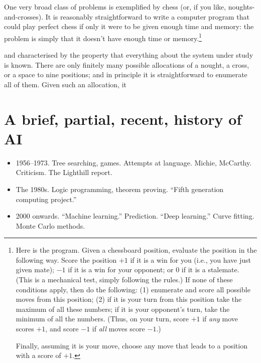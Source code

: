 \documentclass[10pt, a4paper, twocolumn]{article}
\begin{document}
One very broad class of problems is exemplified by chess (or, if you like,
noughts-and-crosses). It is reasonably straightforward to write a computer
program that could play perfect chess if only it were to be given enough time
and memory: the problem is simply that it doesn't have enough time or
memory.\footnote{Here is the program. Given a chessboard position, evaluate the
  position in the following way. Score the position $+1$ if it is a win for you
  (i.e., you have just given mate); $-1$ if it is a win for your opponent; or
  $0$ if it is a stalemate. (This is a mechanical test, simply following the
  rules.) If none of these conditions apply, then do the following: (1)
  enumerate and score all possible moves from this position; (2) if it is your
  turn from this position take the maximum of all these numbers; if it is your
  opponent's turn, take the minimum of all the numbers. (Thus, on your turn,
  score $+1$ if \emph{any} move scores $+1$, and score $-1$ if \emph{all} moves
  score $-1$.)

  Finally, assuming it is your move, choose any move that leads to a position
  with a score of $+1$.}

and characterised by the property that everything about the
system under study is known. There are only finitely many possible allocations
of a nought, a cross, or a space to nine positions; and in principle it is
straightforward to enumerate all of them. Given such an allocation, it






\section{A brief, partial, recent, history of AI}

\begin{itemize}
\item 1956–1973. Tree searching, games. Attempts at language. Michie,
  McCarthy. Criticism. The Lighthill report. 
\item The 1980s. Logic programming, theorem proving. ``Fifth generation
  computing project.'' 
\item 2000 onwards. ``Machine learning.'' Prediction. ``Deep learning.'' Curve
  fitting. Monte Carlo methods.
\end{itemize}




\printbibliography%
\end{document}
